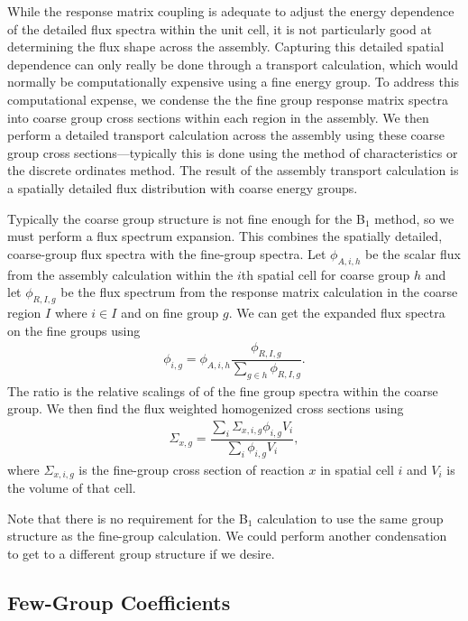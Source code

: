 While the response matrix coupling is adequate to adjust the energy dependence of the detailed flux spectra within the unit cell, it is not particularly good at determining the flux shape across the assembly. Capturing this detailed spatial dependence can only really be done through a transport calculation, which would normally be computationally expensive using a fine energy group. To address this computational expense, we condense the the fine group response matrix spectra into coarse group cross sections within each region in the assembly. We then perform a detailed transport calculation across the assembly using these coarse group cross sections---typically this is done using the method of characteristics or the discrete ordinates method. The result of the assembly transport calculation is a spatially detailed flux distribution with coarse energy groups. 

Typically the coarse group structure is not fine enough for the B$_1$ method, so we must perform a flux spectrum expansion. This combines the spatially detailed, coarse-group flux spectra with the fine-group spectra. Let $\phi_{A,i,h}$ be the scalar flux from the assembly calculation within the $i$th spatial cell for coarse group $h$ and let $\phi_{R,I,g}$ be the flux spectrum from the response matrix calculation in the coarse region $I$ where $i \in I$ and on fine group $g$. We can get the expanded flux spectra on the fine groups using
\begin{align}
  \phi_{i,g} = \phi_{A,i,h} \dfrac{ \phi_{R,I,g} }{ \displaystyle\sum_{g \in h} \phi_{R,I,g} } .
\end{align}
The ratio is the relative scalings of of the fine group spectra within the coarse group. We then find the flux weighted homogenized cross sections using
\begin{align}
  \Sigma_{x,g} = \dfrac{ \displaystyle\sum_i \Sigma_{x,i,g} \phi_{i,g} V_i }{ \displaystyle\sum_i \phi_{i,g} V_i },
\end{align}
where $\Sigma_{x,i,g}$ is the fine-group cross section of reaction $x$ in spatial cell $i$ and $V_i$ is the volume of that cell.

Note that there is no requirement for the B$_1$ calculation to use the same group structure as the fine-group calculation. We could perform another condensation to get to a different group structure if we desire.


\subsection{Few-Group Coefficients}

